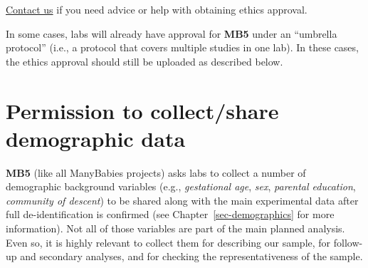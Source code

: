 \documentclass[
  letterpaper,
  DIV=11,
  numbers=noendperiod,
  oneside]{scrreprt}
\begin{document}
\href{mailto:mb5@manybabies.org}{Contact us} if you need advice or help
with obtaining ethics approval.

\begin{tcolorbox}[enhanced jigsaw, coltitle=black, colframe=quarto-callout-note-color-frame, titlerule=0mm, colback=white, arc=.35mm, toprule=.15mm, left=2mm, colbacktitle=quarto-callout-note-color!10!white, opacityback=0, bottomtitle=1mm, title=\textcolor{quarto-callout-note-color}{\faInfo}\hspace{0.5em}{Umbrella protocols}, breakable, rightrule=.15mm, opacitybacktitle=0.6, toptitle=1mm, leftrule=.75mm, bottomrule=.15mm]

In some cases, labs will already have approval for \textbf{MB5} under an
``umbrella protocol'' (i.e., a protocol that covers multiple studies in
one lab). In these cases, the ethics approval should still be uploaded
as described below.

\end{tcolorbox}

\section{Permission to collect/share demographic
data}\label{permission-to-collectshare-demographic-data}

\textbf{MB5} (like all ManyBabies projects) asks labs to collect a
number of demographic background variables (e.g., \emph{gestational
age}, \emph{sex}, \emph{parental education}, \emph{community of
descent}) to be shared along with the main experimental data after full
de-identification is confirmed (see Chapter~\ref{sec-demographics} for
more information). Not all of those variables are part of the main
planned analysis. Even so, it is highly relevant to collect them for
describing our sample, for follow-up and secondary analyses, and for
checking the representativeness of the sample.
\end{document}
